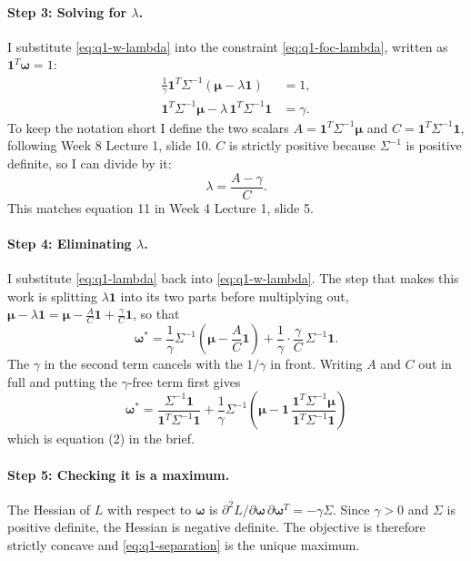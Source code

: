\documentclass[11pt]{article}
\numberwithin{equation}{section}
\begin{document}
\paragraph{Step 3: Solving for $\lambda$.}
I substitute \eqref{eq:q1-w-lambda} into the constraint \eqref{eq:q1-foc-lambda}, written as $\mathbf{1}^{T}\bm{\omega} = 1$:
\begin{align*}
  \frac{1}{\gamma}\mathbf{1}^{T}\Sigma^{-1}\left(\bm{\mu} - \lambda\mathbf{1}\right) &= 1, \\
  \mathbf{1}^{T}\Sigma^{-1}\bm{\mu} - \lambda\,\mathbf{1}^{T}\Sigma^{-1}\mathbf{1} &= \gamma.
\end{align*}
To keep the notation short I define the two scalars $A = \mathbf{1}^{T}\Sigma^{-1}\bm{\mu}$ and $C = \mathbf{1}^{T}\Sigma^{-1}\mathbf{1}$, following Week 8 Lecture 1, slide 10. $C$ is strictly positive because $\Sigma^{-1}$ is positive definite, so I can divide by it:
\begin{equation}
  \lambda = \frac{A - \gamma}{C}.
  \label{eq:q1-lambda}
\end{equation}
This matches equation 11 in Week 4 Lecture 1, slide 5.

\paragraph{Step 4: Eliminating $\lambda$.}
I substitute \eqref{eq:q1-lambda} back into \eqref{eq:q1-w-lambda}. The step that makes this work is splitting $\lambda\mathbf{1}$ into its two parts before multiplying out, $\bm{\mu} - \lambda\mathbf{1} = \bm{\mu} - \frac{A}{C}\mathbf{1} + \frac{\gamma}{C}\mathbf{1}$, so that
\begin{equation*}
  \bm{\omega}^{*} = \frac{1}{\gamma}\Sigma^{-1}\left(\bm{\mu} - \frac{A}{C}\mathbf{1}\right) + \frac{1}{\gamma}\cdot\frac{\gamma}{C}\,\Sigma^{-1}\mathbf{1}.
\end{equation*}
The $\gamma$ in the second term cancels with the $1/\gamma$ in front. Writing $A$ and $C$ out in full and putting the $\gamma$-free term first gives
\begin{equation}
  \boxed{\;\bm{\omega}^{*} = \frac{\Sigma^{-1}\mathbf{1}}{\mathbf{1}^{T}\Sigma^{-1}\mathbf{1}} + \frac{1}{\gamma}\Sigma^{-1}\left(\bm{\mu} - \mathbf{1}\,\frac{\mathbf{1}^{T}\Sigma^{-1}\bm{\mu}}{\mathbf{1}^{T}\Sigma^{-1}\mathbf{1}}\right)\;}
  \label{eq:q1-separation}
\end{equation}
which is equation (2) in the brief.

\paragraph{Step 5: Checking it is a maximum.}
The Hessian of $L$ with respect to $\bm{\omega}$ is $\partial^{2} L/\partial\bm{\omega}\,\partial\bm{\omega}^{T} = -\gamma\Sigma$. Since $\gamma > 0$ and $\Sigma$ is positive definite, the Hessian is negative definite. The objective is therefore strictly concave and \eqref{eq:q1-separation} is the unique maximum.
\end{document}
